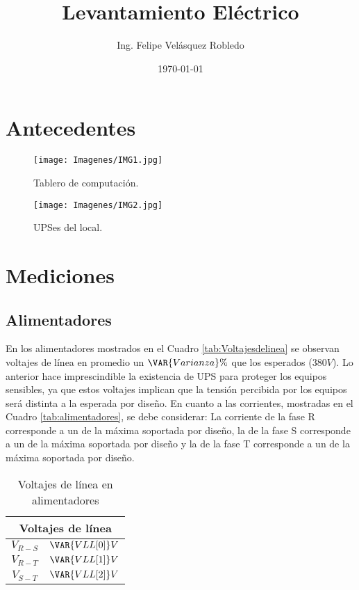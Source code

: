 \documentclass{article}
\title{Levantamiento Eléctrico\\\VAR{ID_Local}}
\author{Ing. Felipe Velásquez Robledo}
\date{\today}
\begin{document}
\maketitle
\pagestyle{fancy}
\thispagestyle{fancy}
\begin{abstract}
\end{abstract}
\section{Antecedentes}

\begin{figure}
\centering
\texttt{[image: Imagenes/IMG1.jpg]}
\caption{\label{fig:Tablero}Tablero de computación.}
\end{figure}

\begin{figure}
\centering
\texttt{[image: Imagenes/IMG2.jpg]}
\caption{\label{fig:UPSes}UPSes del local.}
\end{figure}


\section{Mediciones}
\subsection{Alimentadores}
En los alimentadores mostrados en el Cuadro  \ref{tab:Voltajesdelinea} se observan voltajes de línea en promedio un $ \VAR{Varianza}\% $  que los esperados ($380V$). Lo anterior hace imprescindible la existencia de UPS para proteger los equipos sensibles, ya que estos voltajes implican que la tensión percibida por los equipos será distinta a la esperada por diseño.
En cuanto a las corrientes, mostradas en el Cuadro \ref{tab:alimentadores}, se debe considerar: La corriente de la fase R corresponde a un  de la máxima soportada por diseño, la de la fase S corresponde a un  de la máxima soportada por diseño y la de la fase T corresponde a un  de la máxima soportada por diseño.

\begin{center}
    \begin{table}[H]
        \centering
        \begin{tabular}{c c}
        \multicolumn{2}{c}{Voltajes de línea}\\\hline
             $V_{R-S}$ & $\VAR{VLL[0]} V$ \\
             $V_{R-T}$ & $\VAR{VLL[1]} V$ \\
             $V_{S-T}$ & $\VAR{VLL[2]} V$ \\
        \end{tabular}
        \caption{Voltajes de línea en alimentadores}
        \label{tab:Voltajesdelínea}
    \end{table}
\end{center}
\end{document}

